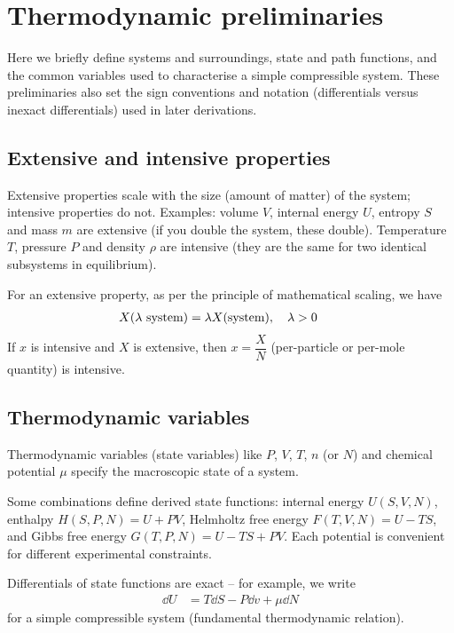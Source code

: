 \section{Thermodynamic preliminaries}
    
    Here we briefly define systems and surroundings, state and path functions, and the common variables used to characterise a simple compressible system. These preliminaries also set the sign conventions and notation (differentials versus inexact differentials) used in later derivations.
    
    \subsection{Extensive and intensive properties}
	    Extensive properties scale with the size (amount of matter) of the system; intensive properties do not. Examples: volume $V$, internal energy $U$, entropy $S$ and mass $m$ are extensive (if you double the system, these double). Temperature $T$, pressure $P$ and density $\rho$ are intensive (they are the same for two identical subsystems in equilibrium).
	    
	    For an extensive property, as per the principle of mathematical scaling, we have
	    \begin{align*}
	    	X(\lambda\text{ system})&=\lambda X(\text{system}),\qq{$\lambda>0$}
	    \end{align*}
	    If $x$ is intensive and $X$ is extensive, then $x=\dfrac{X}{N}$ (per-particle or per-mole quantity) is intensive.
	    
	\subsection{Thermodynamic variables}
		Thermodynamic variables (state variables) like $P$, $V$, $T$, $n$ (or $N$) and chemical potential $\mu$ specify the macroscopic state of a system.
		
		Some combinations define derived state functions: internal energy $U(S,V,N)$, enthalpy $H(S,P,N)=U+PV$, Helmholtz free energy $F(T,V,N)=U-TS$, and Gibbs free energy $G(T,P,N)=U-TS+PV$. Each potential is convenient for different experimental constraints.
		
		Differentials of state functions are exact -- for example, we write
		\begin{align*}
			\dd{U}&=T\dd{S}-P\dd{v}+\mu\dd{N}
		\end{align*}
		for a simple compressible system (fundamental thermodynamic relation).
		
